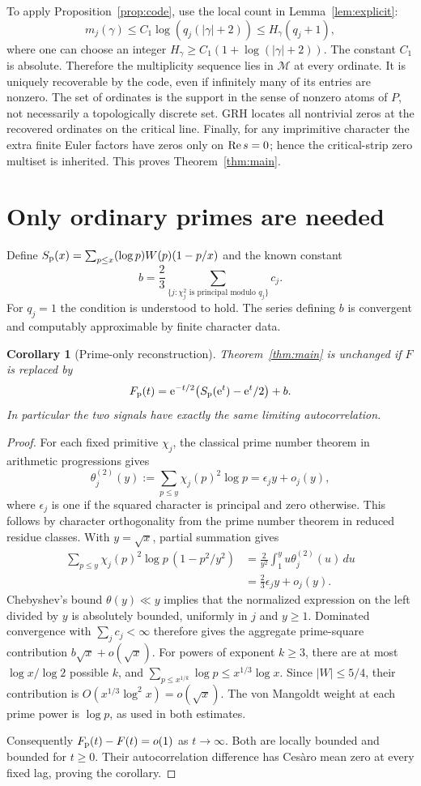\documentclass[11pt]{article}
\newtheorem{corollary}[theorem]{Corollary}
\theoremstyle{remark}\newtheorem{remark}[theorem]{Remark}
\begin{document}
To apply Proposition~\ref{prop:code}, use the local count in Lemma~\ref{lem:explicit}:
\[
m_j(\gamma)\le C_1\log(q_j(|\gamma|+2))
\le H_\gamma (q_j+1),
\]
where one can choose an integer $H_\gamma\ge C_1(1+\log(|\gamma|+2))$. The constant $C_1$ is absolute. Therefore the multiplicity sequence lies in $\mathcal M$ at every ordinate. It is uniquely recoverable by the code, even if infinitely many of its entries are nonzero. The set of ordinates is the support in the sense of nonzero atoms of $P$, not necessarily a topologically discrete set. GRH locates all nontrivial zeros at the recovered ordinates on the critical line. Finally, for any imprimitive character the extra finite Euler factors have zeros only on $\operatorname{Re} s=0$; hence the critical-strip zero multiset is inherited. This proves Theorem~\ref{thm:main}.

\section{Only ordinary primes are needed}
Define $S_{\rm p}(x)=\sum_{p\le x} (\log p) W(p)(1-p/x)$ and the known constant
\[
b=\frac23\sum_{\{j:\chi_j^2\text{ is principal modulo }q_j\}}c_j.
\]
For $q_j=1$ the condition is understood to hold. The series defining $b$ is convergent and computably approximable by finite character data.
\begin{corollary}[Prime-only reconstruction]\label{cor:prime}
Theorem~\ref{thm:main} is unchanged if $F$ is replaced by
\[
F_{\rm p}(t)=\mathrm e^{-t/2}\bigl(S_{\rm p}(\mathrm e^t)-\mathrm e^t/2\bigr)+b.
\]
In particular the two signals have exactly the same limiting autocorrelation.
\end{corollary}
\begin{proof}
For each fixed primitive $\chi_j$, the classical prime number theorem in arithmetic progressions gives
\[
\theta_j^{(2)}(y):=\sum_{p\le y}\chi_j(p)^2\log p
=\epsilon_j y+o_j(y),
\]
where $\epsilon_j$ is one if the squared character is principal and zero otherwise. This follows by character orthogonality from the prime number theorem in reduced residue classes. With $y=\sqrt{x}$, partial summation gives
\begin{align*}
\sum_{p\le y}\chi_j(p)^2\log p\,(1-p^2/y^2)
&=\frac2{y^2}\int_1^y u\theta_j^{(2)}(u)\,du\\
&=\tfrac23\epsilon_j y+o_j(y).
\end{align*}
Chebyshev's bound $\theta(y)\ll y$ implies that the normalized expression on the left divided by $y$ is absolutely bounded, uniformly in $j$ and $y\ge1$. Dominated convergence with $\sum_j c_j<\infty$ therefore gives the aggregate prime-square contribution $b\sqrt{x}+o(\sqrt{x})$. For powers of exponent $k\ge3$, there are at most $\log x/\log 2$ possible $k$, and $\sum_{p\le x^{1/k}}\log p\le x^{1/3}\log x$. Since $|W|\le5/4$, their contribution is $O(x^{1/3}\log^2 x)=o(\sqrt{x})$. The von Mangoldt weight at each prime power is $\log p$, as used in both estimates.

Consequently $F_{\rm p}(t)-F(t)=o(1)$ as $t\to\infty$. Both are locally bounded and bounded for $t\ge0$. Their autocorrelation difference has Ces\`aro mean zero at every fixed lag, proving the corollary.
\end{proof}
\end{document}
